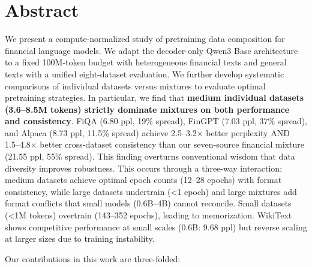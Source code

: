 \documentclass[11pt,a4paper,english,oneside]{book}
\begin{document}
\thispagestyle{empty}
\titleGP

\newpage

\setcounter{page}{1}

\section*{Abstract}
\thispagestyle{firststyle}

We present a compute-normalized study of pretraining data composition for financial language models. We adapt the decoder-only Qwen3 Base architecture to a fixed 100M-token budget with heterogeneous financial texts and general texts with a unified eight-dataset evaluation. We further develop systematic comparisons of individual datasets versus mixtures to evaluate optimal pretraining strategies. In particular, we find that \textbf{medium individual datasets (3.6–8.5M tokens) strictly dominate mixtures on both performance and consistency}. FiQA (6.80 ppl, 19\% spread), FinGPT (7.03 ppl, 37\% spread), and Alpaca (8.73 ppl, 11.5\% spread) achieve 2.5–3.2$\times$ better perplexity AND 1.5–4.8$\times$ better cross-dataset consistency than our seven-source financial mixture (21.55 ppl, 55\% spread). This finding overturns conventional wisdom that data diversity improves robustness. This occurs through a three-way interaction: medium datasets achieve optimal epoch counts (12–28 epochs) with format consistency, while large datasets undertrain (<1 epoch) and large mixtures add format conflicts that small models (0.6B–4B) cannot reconcile. Small datasets (<1M tokens) overtrain (143–352 epochs), leading to memorization. WikiText shows competitive performance at small scales (0.6B: 9.68 ppl) but reverse scaling at larger sizes due to training instability.

Our contributions in this work are three-folded:
\end{document}
